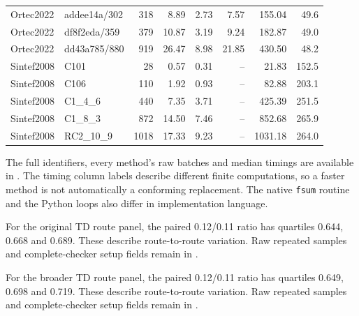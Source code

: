 \begin{longtable}{llrrrrrr}
Ortec2022 & addee14a/302 & 318 & 8.89 & 2.73 & 7.57 & 155.04 & 49.6 \\
Ortec2022 & df8f2eda/359 & 379 & 10.87 & 3.19 & 9.24 & 182.87 & 49.0 \\
Ortec2022 & dd43a785/880 & 919 & 26.47 & 8.98 & 21.85 & 430.50 & 48.2 \\
Sintef2008 & C101 & 28 & 0.57 & 0.31 & -- & 21.83 & 152.5 \\
Sintef2008 & C106 & 110 & 1.92 & 0.93 & -- & 82.88 & 203.1 \\
Sintef2008 & C1\_4\_6 & 440 & 7.35 & 3.71 & -- & 425.39 & 251.5 \\
Sintef2008 & C1\_8\_3 & 872 & 14.50 & 7.46 & -- & 852.68 & 265.9 \\
Sintef2008 & RC2\_10\_9 & 1018 & 17.33 & 9.23 & -- & 1031.18 & 264.0 \\
\end{longtable}
\endgroup

The full identifiers, every method's raw batches and median timings are available in . The timing column labels describe different finite computations, so a faster method is not automatically a conforming replacement. The native \texttt{fsum} routine and the Python loops also differ in implementation language.

For the original TD route panel, the paired 0.12/0.11 ratio has quartiles 0.644, 0.668 and 0.689. These describe route-to-route variation. Raw repeated samples and complete-checker setup fields remain in .

For the broader TD route panel, the paired 0.12/0.11 ratio has quartiles 0.649, 0.698 and 0.719. These describe route-to-route variation. Raw repeated samples and complete-checker setup fields remain in .

